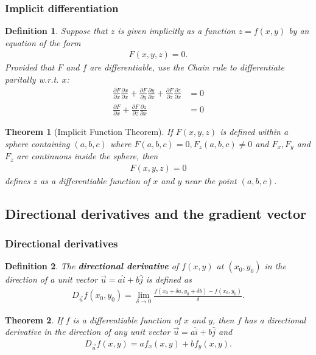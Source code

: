 \documentclass{article}
\theoremstyle{sltheorem}
\newtheorem{definition}{Definition}[section]
\newtheorem{theorem}{Theorem}[section]
\newcommand{\ih}{\widehat i}
\newcommand{\jh}{\widehat j}
\newcommand{\p}{\partial}
\newcommand*\B[1]{\textbf{#1}}
\begin{document}
\subsubsection{Implicit differentiation}
\begin{definition}
    Suppose that $z$ is given implicitly as a function $z=f(x,y)$ by an
    equation of the form
    \begin{align*}
        F(x,y,z)=0.
    \end{align*}
    Provided that $F$ and $f$ are differentiable, use the Chain rule to
    differentiate paritally w.r.t. $x$:
    \begin{align*}
        \frac{\p F}{\p x}\frac{\p x}{\p x}+\frac{\p F}{\p y}\frac{\p y}{\p x}
        + \frac{\p F}{\p z}\frac{\p z}{\p x} &= 0\\
        \frac{\p F}{\p x} + \frac{\p F}{\p z}\frac{\p z}{\p x} &= 0
    \end{align*}
\end{definition}
\begin{theorem}[Implicit Function Theorem]
    If $F(x,y,z)$ is defined within a sphere containing $(a,b,c)$
    where $F(a,b,c)=0, F_z(a,b,c)\not=0$ and $F_x,F_y$ and $F_z$ are
    continuous inside the sphere, then
    \begin{align*}
        F(x,y,z)=0
    \end{align*} 
    defines $z$ as a differentiable function of $x$ and $y$ near the
    point $(a,b,c)$.
\end{theorem}
\subsection{Directional derivatives and the gradient vector}
\subsubsection{Directional derivatives}
\begin{definition}
    The \B{directional derivative} of $f(x,y)$ at $(x_0,y_0)$ in the
    direction of a \emph{unit vector} $\vec u=a\ih + b\jh$ is defined as
    \begin{align*}
        D_{\vec u}f(x_0, y_0)=\lim_{\delta \to 0}
        \frac{f(x_0+\delta a, y_0 + \delta b)-f(x_0, y_0)}{\delta}.
    \end{align*}
\end{definition}
\begin{theorem}
    If $f$ is a differentiable function of $x$ and $y$, then $f$
    has a directional derivative in the direction of any unit vector
    $\vec u=a\ih + b\jh$ and
    \begin{align*}
        D_{\vec u}f(x,y) = af_x(x,y) + bf_y(x,y).
    \end{align*}
\end{theorem}
\end{document}
